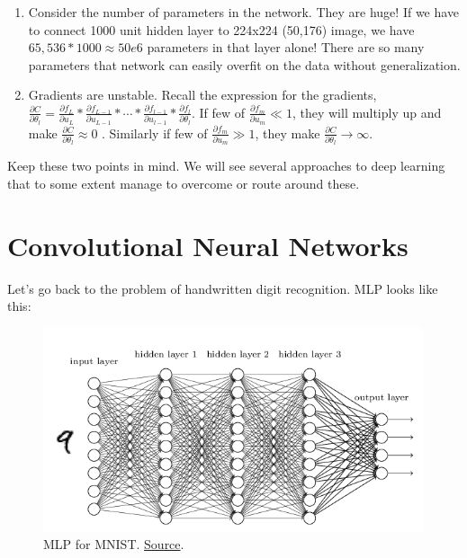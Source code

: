 \documentclass[a4paper]{tufte-handout}
\begin{document}
\begin{enumerate}
\item
  Consider the number of parameters in the network. They are huge! If we
  have to connect 1000 unit hidden layer to 224x224 (50,176) image, we
  have \(65,536*1000 \approx 50e6\) parameters in that layer alone!
  There are so many parameters that network can easily overfit on the
  data without generalization.
\item
  Gradients are unstable. Recall the expression for the gradients,
  \(\frac{\partial C}{\partial \theta_l} = \frac{\partial f_L}{\partial u_L} * \frac{\partial f_{L-1}}{\partial u_{L-1}} * \cdots * \frac{\partial f_{l-1}}{\partial u_{l-1}} * \frac{\partial f_l}{\partial \theta_l}\).
  If few of \(\frac{\partial f_m}{\partial u_m} \ll 1\), they will
  multiply up and make
  \(\frac{\partial C}{\partial \theta_l} \approx 0\)
  . Similarly if few of
  \(\frac{\partial f_m}{\partial u_m} \gg 1\), they make
  \(\frac{\partial C}{\partial \theta_l} \to \infty\). 
\end{enumerate}

Keep these two points in mind. We will see several approaches to deep
learning that to some extent manage to overcome or route around these.


\section{Convolutional Neural
Networks}\label{convolutional-neural-networks}

Let's go back to the problem of handwritten digit recognition. MLP looks
like this:

\begin{figure}
  \includegraphics[height=60mm]{mnist_net.png}
  \caption{MLP for MNIST.
  \href{http://neuralnetworksanddeeplearning.com/chap5.html\%22}{Source}.}
\end{figure}
\end{document}
